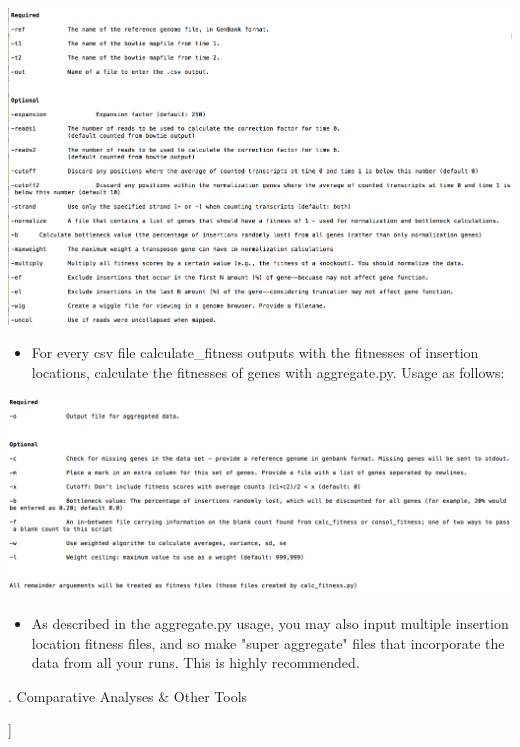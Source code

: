 \documentclass{article}
\begin{document}
\includegraphics[scale=0.4]{CalcOpts.png}

\begin{itemize}

\item For every csv file calculate\_fitness outputs with the fitnesses of insertion locations, calculate the fitnesses of genes with aggregate.py. Usage as follows:

\end{itemize}

\includegraphics[scale=0.4]{AggOpts.png}

\vspace{5 mm}

\begin{itemize}

\item As described in the aggregate.py usage, you may also input multiple insertion location fitness files, and so make "super aggregate" files that incorporate the data from all your runs. This is highly recommended.

\end{itemize}

\vspace{5 mm}


. Comparative Analyses \& Other Tools

\noindent
[[Margaret's command line documentation should fit in well here - I tried matching my commamd line documentation to her formatting!]]
\end{document}
